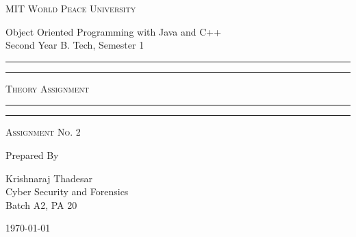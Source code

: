 \documentclass[11pt]{article}
\begin{document}
\begin{titlepage}
	\centering


	\huge\textsc{
		MIT World Peace University
	}\\

	\vspace{0.75\baselineskip} %

	\LARGE{
		Object Oriented Programming with Java and C++\\
		Second Year B. Tech, Semester 1
	}

	\vfill %


	\rule{\textwidth}{1.6pt}\vspace*{-\baselineskip}\vspace*{2pt}
	\rule{\textwidth}{0.6pt}
	\vspace{0.75\baselineskip} %



	\huge{\textsc{
			Theory Assignment
		}} \\



	\vspace{0.5\baselineskip} %
	\rule{\textwidth}{0.6pt}\vspace*{-\baselineskip}\vspace*{2.8pt}
	\rule{\textwidth}{1.6pt}

	\vspace{1\baselineskip} %


	\LARGE\textsc{
		Assignment No. 2
	} %
	\vfill


	Prepared By
	\vspace{0.5\baselineskip} %

	\Large{
		Krishnaraj Thadesar \\
		Cyber Security and Forensics\\
		Batch A2, PA 20
	}


	\vspace{0.5\baselineskip} %
	\today

\end{titlepage}
\end{document}

